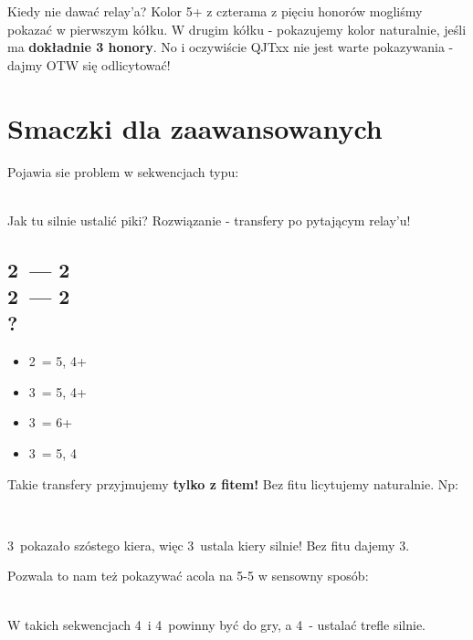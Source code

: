 \documentclass[12pt, a4paper]{article}
\begin{document}
Kiedy nie dawać relay'a? Kolor 5+ z czterama z pięciu honorów mogliśmy pokazać w pierwszym kółku.
W drugim kółku - pokazujemy kolor naturalnie, jeśli ma \textbf{dokładnie 3 honory}. No i oczywiście
\diams QJTxx nie jest warte pokazywania - dajmy OTW się odlicytować!

\pagebreak
\section{Smaczki dla zaawansowanych}
\raggedright
Pojawia sie problem w sekwencjach typu: \\[1em]

 \\[1em] \raggedright

Jak tu silnie ustalić piki? Rozwiązanie - transfery po pytającym relay'u!

\subsection*{2\clubs\ --- 2\diams\ \\ 2\hearts\ --- 2\spades\ \\ ?}
\begin{itemize}
    \item 2\nt\ = 5\hearts, 4+\clubs
    \item 3\clubs\ = 5\hearts, 4+\diams
    \item 3\diams\ = 6+\hearts
    \item 3\hearts\ = 5\hearts, 4\spades
\end{itemize}

Takie transfery przyjmujemy \textbf{tylko z fitem!} Bez fitu licytujemy naturalnie. Np:

\webidding{
    2\clubs\ & 2\diams \\
    2\hearts\ & 2\spades \\
    \conventional{3\diams} & 3\hearts
} \\[1em] \raggedright

3\diams\ pokazało szóstego kiera, więc 3\hearts\ ustala kiery silnie! Bez fitu dajemy 3\nt.

\raggedright
Pozwala to nam też pokazywać acola na 5-5 w sensowny sposób: \\[1em]
\webidding{
    2\clubs\ & 2\diams \\
    2\spades\ & 2\nt \\
    \conventional{3\spades} & 3\nt\ \\
    4\clubs\
} \\[1em] \raggedright

W takich sekwencjach 4\spades\ i 4\nt\ powinny być do gry, a 4\diams\ - ustalać trefle silnie.
\end{document}
